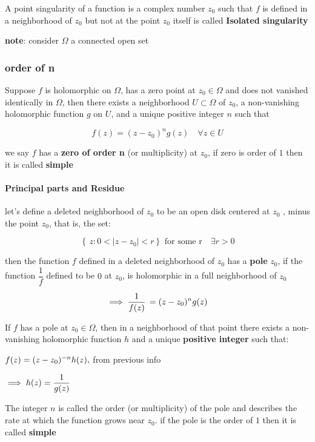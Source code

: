 \documentclass[11pt]{article}
\begin{document}
A point singularity of a function is a complex number \(z_{0}\) such
that \(f\) is defined in a neighborhood of \(z_{0}\) but not at the
point \(z_{0}\) itself is called \textbf{Isolated singularity}

\textbf{note}: consider \(\Omega\) a connected open set

    \subsubsection{order of n}\label{order-of-n}

Suppose \(f\) is holomorphic on \(\Omega\), has a zero point at
\(z_{0} \in \Omega\) and does not vanished identically in \(\Omega\),
then there exists a neighborhood \(U \subset \Omega\) of \(z_{0}\), a
non-vanishing holomorphic function \(g\) on \(U\), and a unique positive
integer \(n\) such that

\[f(z)=(z-z_{0})^{n}g(z)\quad\forall z\in U\]

we say \(f\) has a \textbf{zero of order n} (or multiplicity) at
\(z_{0}\), if zero is order of \(1\) then it is called \textbf{simple}

\paragraph{Principal parts and
Residue}\label{principal-parts-and-residue}

let's define a deleted neighborhood of \(z_{0}\) to be an open disk
centered at \(z_{0}\) , minus the point \(z_{0}\), that is, the set:

\[\left\{\,z: 0< \left|z-z_{0}\right| < r \right\}\,\,\text{for some r}\quad \exists r > 0\]

then the function \(f\) defined in a deleted neighborhood of \(z_{0}\)
has a \textbf{pole} \(z_{0}\), if the function \(\dfrac{1}{f}\) defined
to be \(0\) at \(z_{0}\), is holomorphic in a full neighborhood of
\(z_{0}\)

\[\large\implies \dfrac{1}{f(z)}\,=(z-z_{0})^{n}g(z)\]

If \(f\) has a pole at \(z_{0} \in \Omega\), then in a neighborhood of
that point there exists a non-vanishing holomorphic function \(h\) and a
unique \textbf{positive integer} such that:

\(\large f(z)=(z-z_{0})^{-n}h(z),\) from previous info

\(\large \implies h(z)=\dfrac{1}{g(z)}\)

The integer \(n\) is called the order (or multiplicity) of the pole and
describes the rate at which the function grows near \(z_{0}\). if the
pole is the order of \(1\) then it is called \textbf{simple}
\end{document}
